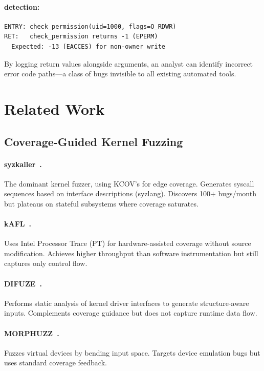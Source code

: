 \documentclass{ndss}
\begin{document}
\paragraph{\toolname{} detection:}
\begin{lstlisting}[numbers=none]
ENTRY: check_permission(uid=1000, flags=O_RDWR)
RET:   check_permission returns -1 (EPERM)
  Expected: -13 (EACCES) for non-owner write
\end{lstlisting}

By logging return values alongside arguments, an analyst can identify incorrect
error code paths---a class of bugs invisible to all existing automated tools.

\section{Related Work}\label{sec:related}

\subsection{Coverage-Guided Kernel Fuzzing}

\paragraph{syzkaller~\cite{vyukov2015syzkaller}.} The dominant kernel fuzzer,
using KCOV's \tracepc for edge coverage. Generates syscall sequences based on
interface descriptions (syzlang). Discovers 100+ bugs/month but plateaus on
stateful subsystems where coverage saturates.

\paragraph{kAFL~\cite{schumilo2017kafl}.} Uses Intel Processor Trace (PT) for
hardware-assisted coverage without source modification. Achieves higher
throughput than software instrumentation but still captures only control flow.

\paragraph{DIFUZE~\cite{corina2017difuze}.} Performs static analysis of kernel
driver interfaces to generate structure-aware inputs. Complements coverage
guidance but does not capture runtime data flow.

\paragraph{MORPHUZZ~\cite{bulekov2022morphuzz}.} Fuzzes virtual devices by
bending input space. Targets device emulation bugs but uses standard coverage
feedback.
\end{document}
